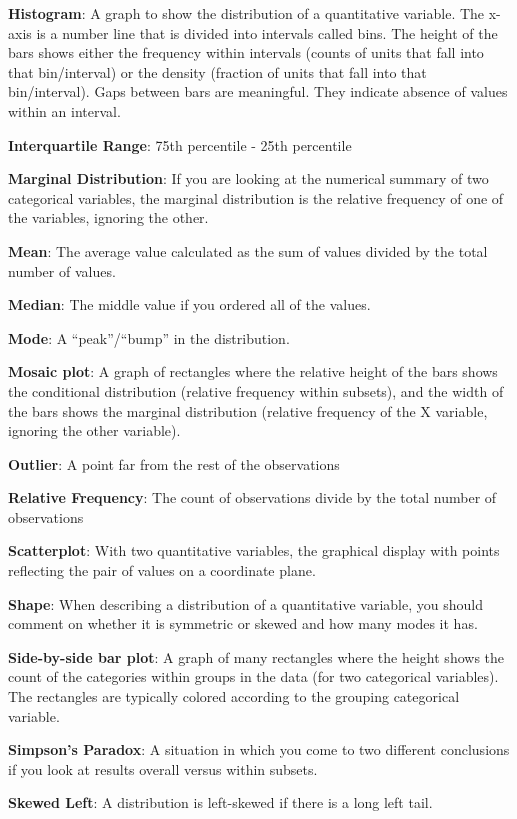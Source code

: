 \documentclass[]{book}
\begin{document}
\textbf{Histogram}: A graph to show the distribution of a quantitative variable. The x-axis is a number line that is divided into intervals called bins. The height of the bars shows either the frequency within intervals (counts of units that fall into that bin/interval) or the density (fraction of units that fall into that bin/interval). Gaps between bars are meaningful. They indicate absence of values within an interval.

\textbf{Interquartile Range}: 75th percentile - 25th percentile

\textbf{Marginal Distribution}: If you are looking at the numerical summary of two categorical variables, the marginal distribution is the relative frequency of one of the variables, ignoring the other.

\textbf{Mean}: The average value calculated as the sum of values divided by the total number of values.

\textbf{Median}: The middle value if you ordered all of the values.

\textbf{Mode}: A ``peak''/``bump'' in the distribution.

\textbf{Mosaic plot}: A graph of rectangles where the relative height of the bars shows the conditional distribution (relative frequency within subsets), and the width of the bars shows the marginal distribution (relative frequency of the X variable, ignoring the other variable).

\textbf{Outlier}: A point far from the rest of the observations

\textbf{Relative Frequency}: The count of observations divide by the total number of observations

\textbf{Scatterplot}: With two quantitative variables, the graphical display with points reflecting the pair of values on a coordinate plane.

\textbf{Shape}: When describing a distribution of a quantitative variable, you should comment on whether it is symmetric or skewed and how many modes it has.

\textbf{Side-by-side bar plot}: A graph of many rectangles where the height shows the count of the categories within groups in the data (for two categorical variables). The rectangles are typically colored according to the grouping categorical variable.

\textbf{Simpson's Paradox}: A situation in which you come to two different conclusions if you look at results overall versus within subsets.

\textbf{Skewed Left}: A distribution is left-skewed if there is a long left tail.
\end{document}
